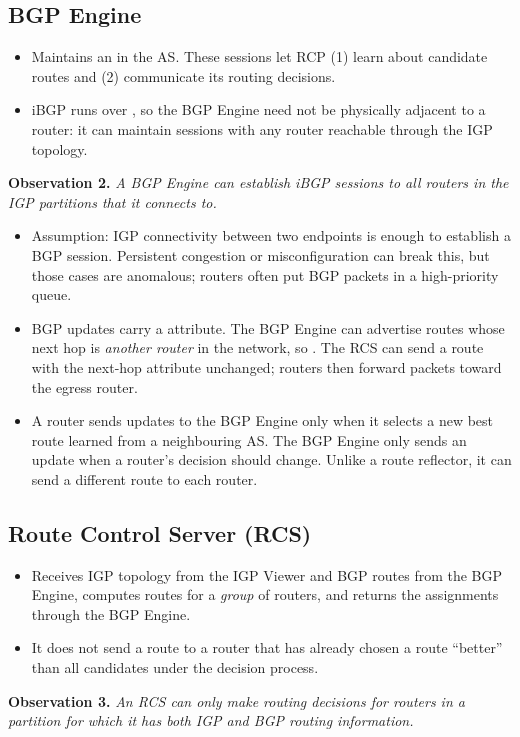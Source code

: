 \subsection{BGP Engine}
\begin{itemize}
\item Maintains an  in the AS. These sessions let RCP (1) learn about candidate routes and (2) communicate its routing decisions.
\item iBGP runs over , so the BGP Engine need not be physically adjacent to a router: it can maintain sessions with any router reachable through the IGP topology.
\end{itemize}
\textbf{Observation 2.} \emph{A BGP Engine can establish iBGP sessions to all routers in the IGP partitions that it connects to.}
\begin{itemize}
\item Assumption: IGP connectivity between two endpoints is enough to establish a BGP session. Persistent congestion or misconfiguration can break this, but those cases are anomalous; routers often put BGP packets in a high-priority queue.
\item BGP updates carry a  attribute. The BGP Engine can advertise routes whose next hop is \emph{another router} in the network, so . The RCS can send a route with the next-hop attribute unchanged; routers then forward packets toward the egress router.
\item A router sends updates to the BGP Engine only when it selects a new best route learned from a neighbouring AS. The BGP Engine only sends an update when a router's decision should change. Unlike a route reflector, it can send a different route to each router.
\end{itemize}

\subsection{Route Control Server (RCS)}
\begin{itemize}
\item Receives IGP topology from the IGP Viewer and BGP routes from the BGP Engine, computes routes for a \emph{group} of routers, and returns the assignments through the BGP Engine.
\item It does not send a route to a router that has already chosen a route ``better'' than all candidates under the decision process.
\end{itemize}
\textbf{Observation 3.} \emph{An RCS can only make routing decisions for routers in a partition for which it has both IGP and BGP routing information.}

